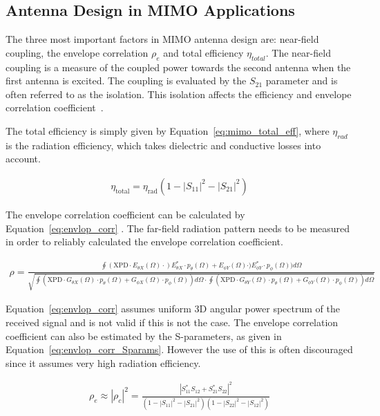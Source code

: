 \subsection{Antenna Design in MIMO Applications}
The three most important factors in MIMO antenna design are: near-field coupling, the envelope correlation $\rho_e$ and total efficiency $\eta_{total}$. The near-field coupling is a measure of the coupled power towards the second antenna when the first antenna is excited. The coupling is evaluated by the $S_{21}$ parameter and is often referred to as the isolation. This isolation affects the efficiency and envelope correlation coefficient~\cite{Tatomirescu2011PortIsolation}. 

The total efficiency is simply given by Equation~\ref{eq:mimo_total_eff}\cite{Tatomirescu2011PortIsolation}, where $\eta_{rad}$ is the radiation efficiency, which takes dielectric and conductive losses into account. 

\begin{align} 
\label{eq:mimo_total_eff}
\eta_{\text{total}}=\eta_{\text{rad}} (1-|S_{11}|^2 - |S_{21}|^2)
\end{align}


The envelope correlation coefficient can be calculated by Equation~\ref{eq:envlop_corr} \cite{Tatomirescu2011PortIsolation}. The far-field radiation pattern needs to be measured in order to reliably calculated the envelope correlation coefficient.

\begin{align} 
\label{eq:envlop_corr}
\rho = \frac{\oint(\text{XPD} \cdot E_{\theta X}(\Omega) \cdot) E^*_{\theta X} \cdot p_\theta(\Omega)+E_{\phi Y}(\Omega) \cdot) E^*_{\phi Y} \cdot p_\phi(\Omega) )d\Omega}{\sqrt{\oint(\text{XPD}\cdot G_{\theta X}(\Omega) \cdot p_\theta(\Omega)+G_{\phi X}(\Omega) \cdot p_\phi(\Omega))d\Omega \cdot \oint(\text{XPD}\cdot G_{\theta Y}(\Omega) \cdot p_\theta(\Omega)+G_{\phi Y}(\Omega) \cdot p_\phi(\Omega))d\Omega }}
\end{align}

Equation~\ref{eq:envlop_corr} assumes uniform 3D angular power spectrum of the received signal and is not valid if this is not the case. The envelope correlation coefficient can also be estimated by the S-parameters, as given in Equation~\ref{eq:envlop_corr_Sparams}\cite{Alain2010MIMO}. However the use of this is often discouraged since it assumes very high radiation efficiency. 

\begin{align}
\label{eq:envlop_corr_Sparams}
  \rho_e \approx |\rho_c|^2 = \frac{|S^*_{11}S_{12}+S^*_{21}S_{22}|^2}{(1-|S_{11}|^2-|S_{21}|^2)(1-|S_{22}|^2-|S_{12}|^2)}
\end{align}

